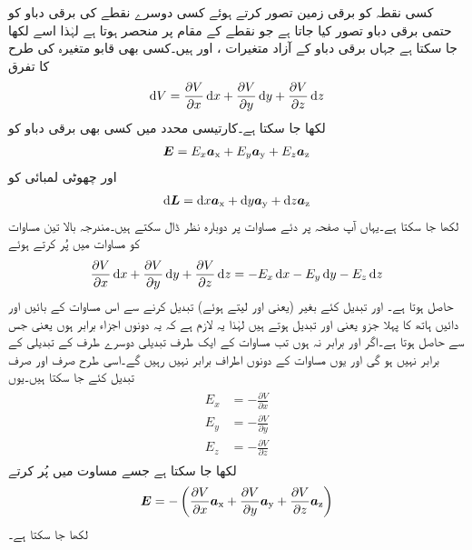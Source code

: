 کسی نقطہ کو برقی زمین تصور کرتے ہوئے کسی دوسرے نقطے کی برقی دباو کو حتمی برقی دباو تصور کیا جاتا ہے جو نقطے کے مقام پر منحصر ہوتا ہے لہٰذا اسے  لکھا جا سکتا ہے جہاں برقی دباو کے آزاد متغیرات ،  اور  ہیں۔کسی بھی قابو متغیرہ کی طرح  کا تفرق
\begin{align}\label{مساوات_توانائی_دباو_کارتیسی_تفرق}
\dif V=\frac{\partial V}{\partial x} \dif x+\frac{\partial V}{\partial y} \dif y +\frac{\partial V}{\partial z} \dif z
\end{align}
لکھا جا سکتا ہے۔کارتیسی محدد میں کسی بھی برقی دباو کو
\begin{align}\label{مساوات_توانائی_میدان}
{\ensuremath{{\boldsymbol{E}}}}=E_x {\boldsymbol{a}}_{\textup{x}}+ E_y {\boldsymbol{a}}_{\textup{y}}+E_z {\boldsymbol{a}}_{\textup{z}}
\end{align}
اور  چھوٹی لمبائی کو
\begin{align}\label{مساوات_توانائی_کارتیسی_چھوٹا_فاصلہ}
\dif \kvec{L}=\dif x \ax+\dif y \ay+\dif z \az
\end{align}
لکھا جا سکتا ہے۔یہاں آپ صفحہ  پر دئے مساوات  پر دوبارہ نظر ڈال سکتے ہیں۔مندرجہ بالا تین مساوات کو مساوات  میں پُر کرتے ہوئے
\begin{align}\label{مساوات_توانائی_دباو_اور_میدان}
\frac{\partial V}{\partial x} \dif x+\frac{\partial V}{\partial y} \dif y +\frac{\partial V}{\partial z} \dif z=-E_x \dif x-E_y \dif y-E_z \dif z
\end{align}
حاصل ہوتا ہے۔ اور  تبدیل کئے بغیر (یعنی  اور  لیتے ہوئے)  تبدیل کرنے سے اس مساوات کے بائیں اور دائیں ہاتھ کا پہلا جزو یعنی  اور  تبدیل ہوتے ہیں لہٰذا یہ لازم ہے کہ یہ دونوں اجزاء برابر ہوں یعنی  جس سے  حاصل ہوتا ہے۔اگر  اور  برابر نہ ہوں تب مساوات کے ایک طرف تبدیلی دوسرے طرف کے تبدیلی کے برابر نہیں ہو گی اور یوں مساوات کے دونوں اطراف برابر نہیں رہیں گے۔اسی طرح صرف  اور صرف  تبدیل کئے جا سکتا ہیں۔یوں
\begin{gather}
\begin{aligned}
E_x&=-\frac{\partial V}{\partial x}\\
E_y&=-\frac{\partial V}{\partial y}\\
E_z&=-\frac{\partial V}{\partial z}
\end{aligned}
\end{gather}
لکھا جا سکتا ہے جسے مساوت  میں پُر کرتے
\begin{align}\label{مساوات_توانائی_ڈھلوان_تعریف_الف}
{\ensuremath{{\boldsymbol{E}}}}=-\left( \frac{\partial V}{\partial x} {\boldsymbol{a}}_{\textup{x}}+\frac{\partial V}{\partial y} {\boldsymbol{a}}_{\textup{y}}+\frac{\partial V}{\partial z} {\boldsymbol{a}}_{\textup{z}}\right)
\end{align}
لکھا جا سکتا ہے۔

